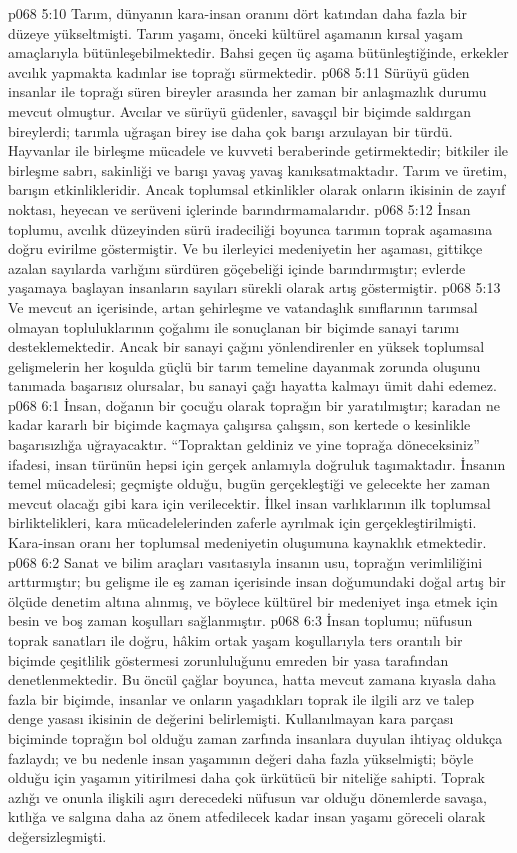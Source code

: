 \vs p068 5:10 Tarım, dünyanın kara\hyp{}insan oranını dört katından daha fazla bir düzeye yükseltmişti. Tarım yaşamı, önceki kültürel aşamanın kırsal yaşam amaçlarıyla bütünleşebilmektedir. Bahsi geçen üç aşama bütünleştiğinde, erkekler avcılık yapmakta kadınlar ise toprağı sürmektedir.
\vs p068 5:11 Sürüyü güden insanlar ile toprağı süren bireyler arasında her zaman bir anlaşmazlık durumu mevcut olmuştur. Avcılar ve sürüyü güdenler, savaşçıl bir biçimde saldırgan bireylerdi; tarımla uğraşan birey ise daha çok barışı arzulayan bir türdü. Hayvanlar ile birleşme mücadele ve kuvveti beraberinde getirmektedir; bitkiler ile birleşme sabrı, sakinliği ve barışı yavaş yavaş kanıksatmaktadır. Tarım ve üretim, barışın etkinlikleridir. Ancak toplumsal etkinlikler olarak onların ikisinin de zayıf noktası, heyecan ve serüveni içlerinde barındırmamalarıdır.
\vs p068 5:12 İnsan toplumu, avcılık düzeyinden sürü iradeciliği boyunca tarımın toprak aşamasına doğru evirilme göstermiştir. Ve bu ilerleyici medeniyetin her aşaması, gittikçe azalan sayılarda varlığını sürdüren göçebeliği içinde barındırmıştır; evlerde yaşamaya başlayan insanların sayıları sürekli olarak artış göstermiştir.
\vs p068 5:13 Ve mevcut an içerisinde, artan şehirleşme ve vatandaşlık sınıflarının tarımsal olmayan topluluklarının çoğalımı ile sonuçlanan bir biçimde sanayi tarımı desteklemektedir. Ancak bir sanayi çağını yönlendirenler en yüksek toplumsal gelişmelerin her koşulda güçlü bir tarım temeline dayanmak zorunda oluşunu tanımada başarısız olursalar, bu sanayi çağı hayatta kalmayı ümit dahi edemez.
\vs p068 6:1 İnsan, doğanın bir çocuğu olarak toprağın bir yaratılmıştır; karadan ne kadar kararlı bir biçimde kaçmaya çalışırsa çalışsın, son kertede o kesinlikle başarısızlığa uğrayacaktır. “Topraktan geldiniz ve yine toprağa döneceksiniz” ifadesi, insan türünün hepsi için gerçek anlamıyla doğruluk taşımaktadır. İnsanın temel mücadelesi; geçmişte olduğu, bugün gerçekleştiği ve gelecekte her zaman mevcut olacağı gibi kara için verilecektir. İlkel insan varlıklarının ilk toplumsal birliktelikleri, kara mücadelelerinden zaferle ayrılmak için gerçekleştirilmişti. Kara\hyp{}insan oranı her toplumsal medeniyetin oluşumuna kaynaklık etmektedir.
\vs p068 6:2 Sanat ve bilim araçları vasıtasıyla insanın usu, toprağın verimliliğini arttırmıştır; bu gelişme ile eş zaman içerisinde insan doğumundaki doğal artış bir ölçüde denetim altına alınmış, ve böylece kültürel bir medeniyet inşa etmek için besin ve boş zaman koşulları sağlanmıştır.
\vs p068 6:3 İnsan toplumu; nüfusun toprak sanatları ile doğru, hâkim ortak yaşam koşullarıyla ters orantılı bir biçimde çeşitlilik göstermesi zorunluluğunu emreden bir yasa tarafından denetlenmektedir. Bu öncül çağlar boyunca, hatta mevcut zamana kıyasla daha fazla bir biçimde, insanlar ve onların yaşadıkları toprak ile ilgili arz ve talep denge yasası ikisinin de değerini belirlemişti. Kullanılmayan kara parçası biçiminde toprağın bol olduğu zaman zarfında insanlara duyulan ihtiyaç oldukça fazlaydı; ve bu nedenle insan yaşamının değeri daha fazla yükselmişti; böyle olduğu için yaşamın yitirilmesi daha çok ürkütücü bir niteliğe sahipti. Toprak azlığı ve onunla ilişkili aşırı derecedeki nüfusun var olduğu dönemlerde savaşa, kıtlığa ve salgına daha az önem atfedilecek kadar insan yaşamı göreceli olarak değersizleşmişti.
